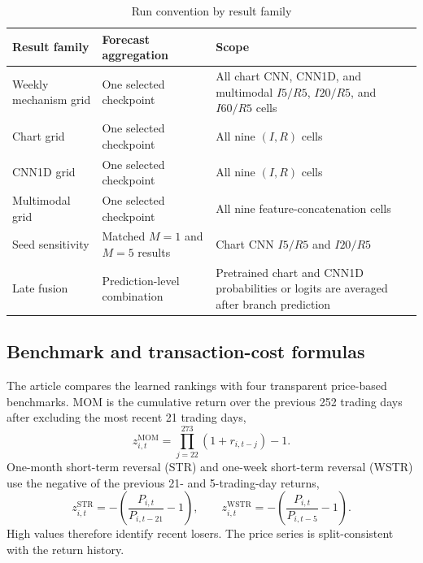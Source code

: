 \begin{table}[htbp]
\centering
\caption{Run convention by result family}
\label{tab:app_run_conventions}
\small
\begin{tabularx}{\textwidth}{@{}>{\raggedright\arraybackslash}p{}>{\raggedright\arraybackslash}p{}L@{}}
\toprule
Result family & Forecast aggregation & Scope \\
\midrule
Weekly mechanism grid & One selected checkpoint & All chart CNN, CNN1D, and multimodal $I5/R5$, $I20/R5$, and $I60/R5$ cells \\
Chart grid & One selected checkpoint & All nine $(I,R)$ cells \\
CNN1D grid & One selected checkpoint & All nine $(I,R)$ cells \\
Multimodal grid & One selected checkpoint & All nine feature-concatenation cells \\
Seed sensitivity & Matched $M=1$ and $M=5$ results & Chart CNN $I5/R5$ and $I20/R5$ \\
Late fusion & Prediction-level combination & Pretrained chart and CNN1D probabilities or logits are averaged after branch prediction \\
\bottomrule
\end{tabularx}
\end{table}

\subsection{Benchmark and transaction-cost formulas}

The article compares the learned rankings with four transparent price-based benchmarks. MOM is the cumulative return over the previous 252 trading days after excluding the most recent 21 trading days,
\begin{equation}
 z^{\mathrm{MOM}}_{i,t}=\prod_{j=22}^{273}(1+r_{i,t-j})-1.
 \label{eq:app_mom}
\end{equation}
One-month short-term reversal (STR) and one-week short-term reversal (WSTR) use the negative of the previous 21- and 5-trading-day returns,
\begin{equation}
 z^{\mathrm{STR}}_{i,t}=-\left(\frac{P_{i,t}}{P_{i,t-21}}-1\right),
 \qquad
 z^{\mathrm{WSTR}}_{i,t}=-\left(\frac{P_{i,t}}{P_{i,t-5}}-1\right).
 \label{eq:app_reversal}
\end{equation}
High values therefore identify recent losers. The price series is split-consistent with the return history.

